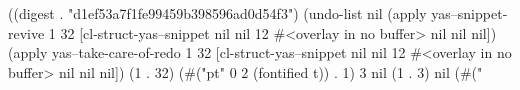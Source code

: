 
((digest . "d1ef53a7f1fe99459b398596ad0d54f3") (undo-list nil (apply yas--snippet-revive 1 32 [cl-struct-yas--snippet nil nil 12 #<overlay in no buffer> nil nil nil]) (apply yas--take-care-of-redo 1 32 [cl-struct-yas--snippet nil nil 12 #<overlay in no buffer> nil nil nil]) (1 . 32) (#("pt" 0 2 (fontified t)) . 1) 3 nil (1 . 3) nil (#("%
